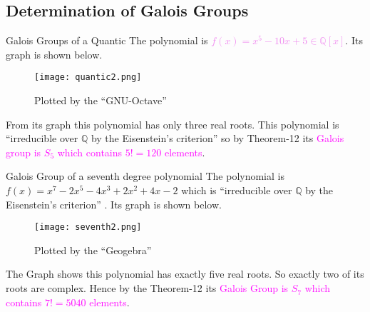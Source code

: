 \documentclass{beamer}
\begin{document}
\subsection{Determination of Galois Groups}
\begin{frame}{Galois Groups of a Quantic}
  The polynomial is \textcolor{violet}{\(f(x)=x^5-10x+5 \in \mathbb{Q}[x]\)}. Its graph is shown below.
  \begin{figure}[h!]
    \texttt{[image: quantic2.png]}
    \caption{\footnotesize Plotted by the ``GNU-Octave''}
  \end{figure}

 From its graph this polynomial has only three real roots. This polynomial is ``irreducible over \(\mathbb{Q}\) by the Eisenstein's criterion'' \cite{hunger} so by Theorem-12 its \textcolor{magenta}{Galois group is \(S_5\) which contains \(5!=120\) elements}.
\end{frame}

\begin{frame}{Galois Group of a seventh degree polynomial}
  The polynomial is \textcolor{green!50!black}{\(f(x)=x^7-2x^5-4x^3+2x^2+4x-2\)} which is ``irreducible over \(\mathbb{Q}\) by the Eisenstein's criterion'' \cite{hunger}. Its graph is shown below.

  \begin{figure}[h!]
    \texttt{[image: seventh2.png]}
    \caption{\footnotesize Plotted by the ``Geogebra''}
  \end{figure}

  The Graph shows this polynomial has exactly five real roots. So exactly two of its roots are complex. Hence by the Theorem-12 its \textcolor{magenta}{Galois Group is \(S_7\) which contains \(7!=5040\) elements}.
\end{frame}
\end{document}
